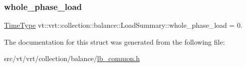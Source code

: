 \subsubsection{\texorpdfstring{whole\+\_\+phase\+\_\+load}{whole\_phase\_load}}
{\footnotesize\ttfamily \hyperlink{namespacevt_a876a9d0cd5a952859c72de8a46881442}{Time\+Type} vt\+::vrt\+::collection\+::balance\+::\+Load\+Summary\+::whole\+\_\+phase\+\_\+load = 0.}



The documentation for this struct was generated from the following file\+:\begin{DoxyCompactItemize}
\item 
src/vt/vrt/collection/balance/\hyperlink{lb__common_8h}{lb\+\_\+common.\+h}\end{DoxyCompactItemize}
